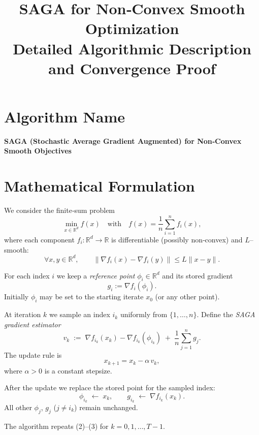 \documentclass{article}
\newcommand{\R}{\mathbb{R}}
\begin{document}
\title{SAGA for Non‑Convex Smooth Optimization \\ Detailed Algorithmic Description and Convergence Proof}
\author{}
\date{}
\maketitle

\tableofcontents
\newpage

\section*{Algorithm Name}
\begin{center}
\textbf{SAGA (Stochastic Average Gradient Augmented) for Non‑Convex Smooth Objectives}
\end{center}

\section*{Mathematical Formulation}
We consider the finite‑sum problem
\[
\min_{x\in\R^{d}} f(x)\quad\text{with}\quad 
f(x)=\frac{1}{n}\sum_{i=1}^{n}f_i(x),
\]
where each component $f_i:\R^{d}\to\R$ is differentiable (possibly non‑convex) and $L$–smooth:
\[
\forall x,y\in\R^{d},\qquad 
\|\nabla f_i(x)-\nabla f_i(y)\|\le L\|x-y\|.
\tag{A1}
\]

For each index $i$ we keep a \emph{reference point} $\phi_i\in\R^{d}$ and its stored gradient
\[
g_i:=\nabla f_i(\phi_i).
\]
Initially $\phi_i$ may be set to the starting iterate $x_0$ (or any other point).

At iteration $k$ we sample an index $i_k$ uniformly from $\{1,\dots,n\}$.
Define the \emph{SAGA gradient estimator}
\[
v_k \;:=\; \nabla f_{i_k}(x_k)-\nabla f_{i_k}(\phi_{i_k})\;+\;\frac{1}{n}\sum_{j=1}^{n} g_j .
\tag{1}
\]
The update rule is
\[
x_{k+1}=x_k-\alpha\,v_k,
\tag{2}
\]
where $\alpha>0$ is a constant stepsize.

After the update we replace the stored point for the sampled index:
\[
\phi_{i_k}\;\leftarrow\;x_k,\qquad 
g_{i_k}\;\leftarrow\;\nabla f_{i_k}(x_k).
\tag{3}
\]
All other $\phi_j$, $g_j$ ($j\neq i_k$) remain unchanged.

The algorithm repeats (2)–(3) for $k=0,1,\dots,T-1$.
\end{document}
